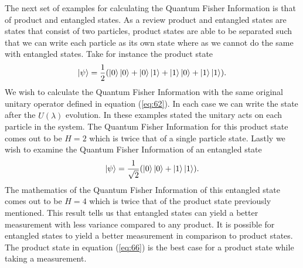 \documentclass[twocolumn]{article}
\begin{document}
The next set of examples for calculating the Quantum Fisher Information is that of product and entangled states. As a review product and entangled states are states that consist of two particles, product states are able to be separated such that we can write each particle as its own state where as we cannot do the same with entangled states. Take for instance the product state 
\begin{equation} \label{eq:66}
\ket{\psi}=\frac{1}{2}(\ket{0}\ket{0}+\ket{0}\ket{1}+\ket{1}\ket{0}+\ket{1}\ket{1}).
\end{equation}
We wish to calculate the Quantum Fisher Information with the same original unitary operator defined in equation (\ref{eq:62}). In each case we can write the state after the $\hat{U}(\lambda)$ evolution. In these examples stated the unitary acts on each particle in the system. The Quantum Fisher Information for this product state comes out to be $H=2$ which is twice that of a single particle state. Lastly we wish to examine the Quantum Fisher Information of an entangled state
\begin{equation} \label{eq:67}
\ket{\psi}=\frac{1}{\sqrt{2}}(\ket{0}\ket{0}+\ket{1}\ket{1}).
\end{equation}
The mathematics of the Quantum Fisher Information of this entangled state comes out to be $H=4$ which is twice that of the product state previously mentioned. This result tells us that entangled states can yield a better measurement with less variance compared to any product. It is possible for entangled states to yield a better measurement in comparison to product states. The product state in equation (\ref{eq:66}) is the best case for a product state while taking a measurement.
\end{document}
